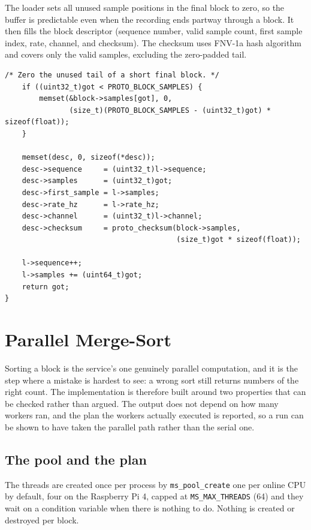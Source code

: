 \documentclass[12pt,a4paper,oneside]{report}
\begin{document}
The loader sets all unused sample positions in the final block to zero, so the buffer is predictable even when the recording ends partway through a block. It then fills the block descriptor (sequence number, valid sample count, first sample index, rate, channel, and checksum). The checksum uses FNV-1a hash algorithm and covers only the valid samples, excluding the zero-padded tail.

\begin{lstlisting}[caption={Zero-padding the final block and populating its descriptor in \texttt{block\_loader\_next}}, label={lst:loader-pad}]
    /* Zero the unused tail of a short final block. */
    if ((uint32_t)got < PROTO_BLOCK_SAMPLES) {
        memset(&block->samples[got], 0,
               (size_t)(PROTO_BLOCK_SAMPLES - (uint32_t)got) * sizeof(float));
    }

    memset(desc, 0, sizeof(*desc));
    desc->sequence     = (uint32_t)l->sequence;
    desc->samples      = (uint32_t)got;
    desc->first_sample = l->samples;
    desc->rate_hz      = l->rate_hz;
    desc->channel      = (uint32_t)l->channel;
    desc->checksum     = proto_checksum(block->samples,
                                        (size_t)got * sizeof(float));

    l->sequence++;
    l->samples += (uint64_t)got;
    return got;
}
\end{lstlisting}

\section{Parallel Merge-Sort}
\label{sec:mergesort}

Sorting a block is the service's one genuinely parallel computation, and it is the
step where a mistake is hardest to see: a wrong sort still returns numbers of the
right count. The implementation is therefore built around two properties that can
be checked rather than argued. The output does not depend on how many workers ran,
and the plan the workers actually executed is reported, so a run can be shown to
have taken the parallel path rather than the serial one.

\subsection{The pool and the plan}

The threads are created once per process by \texttt{ms\_pool\_create}  one per
online CPU by default, four on the Raspberry Pi 4, capped at
\texttt{MS\_MAX\_THREADS} (64)  and they wait on a condition variable when there
is nothing to do. Nothing is created or destroyed per block.
\end{document}
